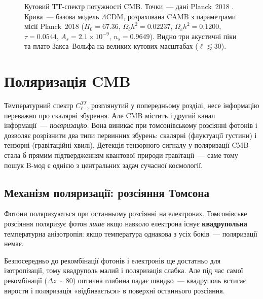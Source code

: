 \documentclass[12pt, a4paper]{article}
\begin{document}
\begin{figure}[b!]
\caption{Кутовий TT-спектр потужності CMB. Точки~--- дані Planck~2018
         \cite{planck_2018}.
         Крива~--- базова модель $\Lambda$CDM, розрахована CAMB
         з параметрами місії Planck~2018 \cite{planck_2018}
         ($H_0=67.36$, $\Omega_b h^2=0.02237$, $\Omega_c h^2=0.1200$,
         $\tau=0.0544$, $A_s=2.1\times10^{-9}$, $n_s=0.9649$).
         Видно три акустичні піки та плато Закса--Вольфа на великих
         кутових масштабах ($\ell \lesssim 30$).}
\label{fig:cmb_tt}
\end{figure}


\section{Поляризація CMB}
\label{sec:pol}

Температурний спектр $C_\ell^{TT}$, розглянутий у попередньому
розділі, несе інформацію переважно про скалярні збурення.
Але CMB містить і другий канал інформації~--- \emph{поляризацію}.
Вона виникає при томсонівському розсіянні фотонів і дозволяє
розрізнити два типи первинних збурень: скалярні (флуктуації
густини) і тензорні (гравітаційні хвилі). Детекція тензорного
сигналу у поляризації CMB стала б прямим підтвердженням
квантової природи гравітації~--- саме тому пошук B-мод є
однією з центральних задач сучасної космології.

\subsection*{Механізм поляризації: розсіяння Томсона}

Фотони поляризуються при останньому розсіянні на електронах.
Томсонівське розсіяння поляризує фотон \emph{лише} якщо навколо електрона
існує \textbf{квадрупольна} температурна анізотропія: якщо температура
однакова з усіх боків~--- поляризації немає.

Безпосередньо до рекомбінації фотонів і електронів ще достатньо для
ізотропізації, тому квадруполь малий і поляризація слабка.
Але під час самої рекомбінації ($\Delta z \sim 80$) оптична глибина
падає швидко~--- квадруполь встигає вирости і поляризація «відбивається»
в поверхні останнього розсіяння.
\end{document}
